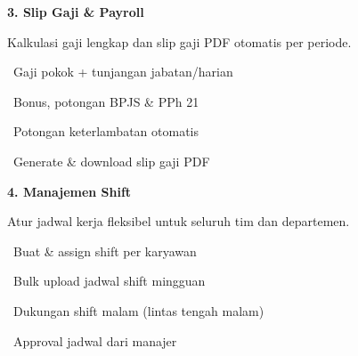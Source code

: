 \documentclass[a4paper]{article}
\begin{document}
\vspace{8pt}

\noindent
\begin{minipage}[t]{0.485\textwidth}
    \colorbox{PurplePrimary}{%
        \begin{minipage}{\dimexpr\textwidth-14pt}
            \vspace{5pt}
            {\fontsize{10}{13}\selectfont\bfseries\color{White} 3. Slip Gaji \& Payroll}
            \vspace{5pt}
        \end{minipage}}
    \vspace{5pt}
    {\fontsize{9}{12}\selectfont\color{TextDark}%
    Kalkulasi gaji lengkap dan slip gaji PDF otomatis per periode.\par\vspace{3pt}
    \textbullet\ Gaji pokok + tunjangan jabatan/harian\par\vspace{2pt}%
    \textbullet\ Bonus, potongan BPJS \& PPh 21\par\vspace{2pt}%
    \textbullet\ Potongan keterlambatan otomatis\par\vspace{2pt}%
    \textbullet\ Generate \& download slip gaji PDF}%
\end{minipage}%
\hfill
\begin{minipage}[t]{0.485\textwidth}
    \colorbox{BlueDark}{%
        \begin{minipage}{\dimexpr\textwidth-14pt}
            \vspace{5pt}
            {\fontsize{10}{13}\selectfont\bfseries\color{White} 4. Manajemen Shift}
            \vspace{5pt}
        \end{minipage}}
    \vspace{5pt}
    {\fontsize{9}{12}\selectfont\color{TextDark}%
    Atur jadwal kerja fleksibel untuk seluruh tim dan departemen.\par\vspace{3pt}
    \textbullet\ Buat \& assign shift per karyawan\par\vspace{2pt}%
    \textbullet\ Bulk upload jadwal shift mingguan\par\vspace{2pt}%
    \textbullet\ Dukungan shift malam (lintas tengah malam)\par\vspace{2pt}%
    \textbullet\ Approval jadwal dari manajer}%
\end{minipage}
\end{document}
